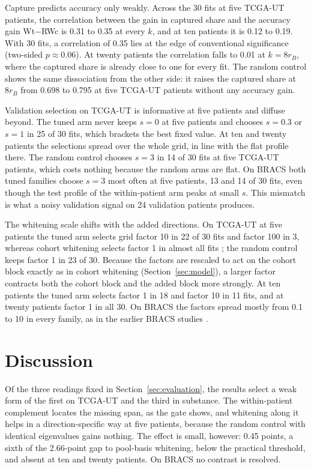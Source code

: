 \noindent Capture predicts accuracy only weakly. Across the 30 fits at five TCGA-UT patients, the correlation between the gain in captured share and the accuracy gain Wt$-$RWc is 0.31 to 0.35 at every $k$, and at ten patients it is 0.12 to 0.19. With 30 fits, a correlation of 0.35 lies at the edge of conventional significance (two-sided $p\approx0.06$). At twenty patients the correlation falls to 0.01 at $k=8r_B$, where the captured share is already close to one for every fit. The random control shows the same dissociation from the other side: it raises the captured share at $8r_B$ from 0.698 to 0.795 at five TCGA-UT patients without any accuracy gain.

Validation selection on TCGA-UT is informative at five patients and diffuse beyond. The tuned arm never keeps $s=0$ at five patients and chooses $s=0.3$ or $s=1$ in 25 of 30 fits, which brackets the best fixed value. At ten and twenty patients the selections spread over the whole grid, in line with the flat profile there. The random control chooses $s=3$ in 14 of 30 fits at five TCGA-UT patients, which costs nothing because the random arms are flat. On BRACS both tuned families choose $s=3$ most often at five patients, 13 and 14 of 30 fits, even though the test profile of the within-patient arm peaks at small $s$. This mismatch is what a noisy validation signal on 24 validation patients produces.

The whitening scale shifts with the added directions. On TCGA-UT at five patients the tuned arm selects grid factor 10 in 22 of 30 fits and factor 100 in 3, whereas cohort whitening selects factor 1 in almost all fits \citep{queisler2026patientDirections}; the random control keeps factor 1 in 23 of 30. Because the factors are rescaled to act on the cohort block exactly as in cohort whitening (Section~\ref{sec:model}), a larger factor contracts both the cohort block and the added block more strongly. At ten patients the tuned arm selects factor 1 in 18 and factor 10 in 11 fits, and at twenty patients factor 1 in all 30. On BRACS the factors spread mostly from 0.1 to 10 in every family, as in the earlier BRACS studies \citep{queisler2026bracsMechanism}.

\section{Discussion}
\label{sec:discussion}
Of the three readings fixed in Section~\ref{sec:evaluation}, the results select a weak form of the first on TCGA-UT and the third in substance. The within-patient complement locates the missing span, as the gate shows, and whitening along it helps in a direction-specific way at five patients, because the random control with identical eigenvalues gains nothing. The effect is small, however: 0.45 points, a sixth of the 2.66-point gap to pool-basis whitening, below the practical threshold, and absent at ten and twenty patients. On BRACS no contrast is resolved.

